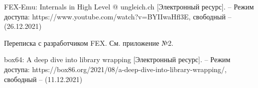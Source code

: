 \begin{thebibliography}{}
FEX-Emu: Internals in High Level @ ungleich.ch [Электронный ресурс]. -- Режим доступа: 		https://www.youtube.com/watch?v=BYIIwaHfl3E,
свободный -- (26.12.2021)

Переписка с разработчиком FEX. См. приложение №2.

box64: A deep dive into library wrapping [Электронный ресурс]. -- Режим доступа: https://box86.org/2021/08/a-deep-dive-into-library-wrapping/,
свободный -- (11.12.2021)

	
	
\end{thebibliography}
\endgroup

\pagebreak